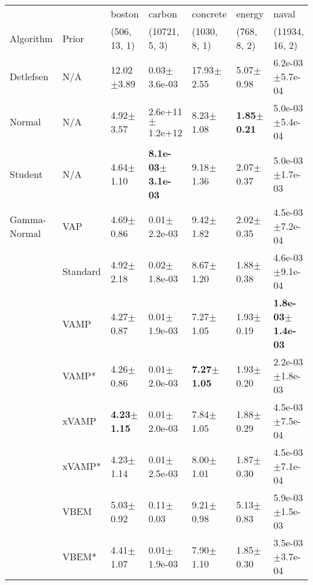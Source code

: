 \begin{tabular}{lllllll}
\toprule
             &       &                  boston &                        carbon &                concrete &                  energy &                         naval \\
Algorithm & Prior& (506, 13, 1)& (10721, 5, 3)& (1030, 8, 1)& (768, 8, 2)& (11934, 16, 2)\\
\midrule
Detlefsen & N/A &          12.02$\pm$3.89 &              0.03$\pm$3.6e-03 &          17.93$\pm$2.55 &           5.07$\pm$0.98 &           6.2e-03$\pm$5.7e-04 \\
Normal & N/A &           4.92$\pm$3.57 &           2.6e+11$\pm$1.2e+12 &           8.23$\pm$1.08 &  \textbf{1.85$\pm$0.21} &           5.0e-03$\pm$5.4e-04 \\
Student & N/A &           4.64$\pm$1.10 &  \textbf{8.1e-03$\pm$3.1e-03} &           9.18$\pm$1.36 &           2.07$\pm$0.37 &           5.0e-03$\pm$1.7e-03 \\
Gamma-Normal & VAP &           4.69$\pm$0.86 &              0.01$\pm$2.2e-03 &           9.42$\pm$1.82 &           2.02$\pm$0.35 &           4.5e-03$\pm$7.2e-04 \\
             & Standard &           4.92$\pm$2.18 &              0.02$\pm$1.8e-03 &           8.67$\pm$1.20 &           1.88$\pm$0.38 &           4.6e-03$\pm$9.1e-04 \\
             & VAMP &           4.27$\pm$0.87 &              0.01$\pm$1.9e-03 &           7.27$\pm$1.05 &           1.93$\pm$0.19 &  \textbf{1.8e-03$\pm$1.4e-03} \\
             & VAMP* &           4.26$\pm$0.86 &              0.01$\pm$2.0e-03 &  \textbf{7.27$\pm$1.05} &           1.93$\pm$0.20 &           2.2e-03$\pm$1.8e-03 \\
             & xVAMP &  \textbf{4.23$\pm$1.15} &              0.01$\pm$2.0e-03 &           7.84$\pm$1.05 &           1.88$\pm$0.29 &           4.5e-03$\pm$7.5e-04 \\
             & xVAMP* &           4.23$\pm$1.14 &              0.01$\pm$2.5e-03 &           8.00$\pm$1.01 &           1.87$\pm$0.30 &           4.5e-03$\pm$7.1e-04 \\
             & VBEM &           5.03$\pm$0.92 &                 0.11$\pm$0.03 &           9.21$\pm$0.98 &           5.13$\pm$0.83 &           5.9e-03$\pm$1.5e-03 \\
             & VBEM* &           4.41$\pm$1.07 &              0.01$\pm$1.9e-03 &           7.90$\pm$1.10 &           1.85$\pm$0.30 &           3.5e-03$\pm$3.7e-04 \\

\end{tabular}
